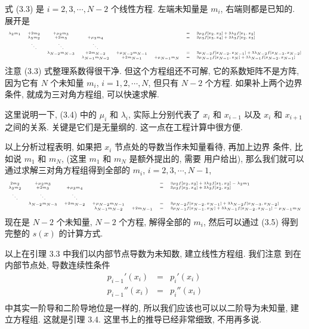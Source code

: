 \documentclass[a4paper]{ctexart}
\begin{document}
式 (3.3) 是 $i = 2, 3, \cdots, N - 2$ 个线性方程. 左端未知量是 $m_i$,
右端则都是已知的. 展开是
$$
\tiny
\begin{array}{cccccccl}
  \lambda_2 m_1 &+ 2 m_2 &+ \mu_2 m_3 &&&&=& 3 \mu_2 f[x_2, x_3] + 3 \lambda_2 f[x_1, x_2] \\
  &\lambda_3 m_2 &+ 2 m_3 &+ \mu_3 m_4 &&&=& 3 \mu_3 f[x_3, x_4] + 3 \lambda_3 f[x_2, x_3] \\
  &\ddots&\ddots&\ddots&&&&\\
  &&\lambda_{N - 2} m_{N - 3} &+ 2 m_{N - 2} &+ \mu_{N - 2} m_{N - 1} &&=& 3 \mu_{N - 2} f[x_{N - 2}, x_{N - 1}] + 3 \lambda_{N - 2} f[x_{N - 3}, x_{N - 2}] \\
  &&&\lambda_{N - 1} m_{N - 2} &+ 2 m_{N - 1} &+ \mu_{N - 1} m_N &=& 3 \mu_{N - 1} f[x_{N - 1}, x_N] + 3 \lambda_{N - 1} f[x_{N - 2}, x_{N - 1}] 
\end{array}
$$
注意 (3.3) 式整理系数得很干净. 但这个方程组还不可解, 
它的系数矩阵不是方阵, 因为它有 $N$ 个未知量 $m_i$, $i = 1, 2, \cdots, N$, 
但只有 $N - 2$ 个方程.
如果补上两个边界条件, 就成为三对角方程组, 可以快速求解.

这里说明一下, (3.4) 中的 $\mu_i$ 和 $\lambda_i$, 
实际上分别代表了 $x_i$ 和 $x_{i - 1}$ 以及 $x_i$ 和 $x_{i + 1}$ 
之间的关系. 关键是它们是无量纲的. 这一点在工程计算中很方便. 

以上分析过程表明, 如果把 $x_i$ 节点处的导数当作未知量看待, 再加上边界
条件, 比如说 $m_1$ 和 $m_{N}$, (这里 $m_1$ 和 $m_N$ 是额外提出的, 需要
用户给出), 那么我们就可以通过求解三对角方程组得到全部的 $m_i$, $i = 2,
3, \cdots, N - 1$,
$$
\tiny
\begin{array}{ccccccl}
  2 m_2 &+ \mu_2 m_3 &&&&=& 3 \mu_2 f[x_2, x_3] + 3 \lambda_2 f[x_1, x_2] - \lambda_2 m_1\\
  \lambda_3 m_2 &+ 2 m_3 &+ \mu_3 m_4 &&&=& 3 \mu_3 f[x_3, x_4] + 3 \lambda_3 f[x_2, x_3] \\
  \ddots&\ddots&\ddots&&&&\\
  &\lambda_{N - 2} m_{N - 3} &+ 2 m_{N - 2} &+ \mu_{N - 2} m_{N - 1} &&=& 3 \mu_{N - 2} f[x_{N - 2}, x_{N - 1}] + 3 \lambda_{N - 2} f[x_{N - 3}, x_{N - 2}] \\
  &&&\lambda_{N - 1} m_{N - 2} &+ 2 m_{N - 1} &=& 3 \mu_{N - 1} f[x_{N - 1}, x_N] + 3 \lambda_{N - 1} f[x_{N - 2}, x_{N - 1}] - \mu_{N - 1} m_N 
\end{array}
$$
现在是 $N - 2$ 个未知量, $N - 2$ 个方程, 解得全部的 $m_i$,
然后可以通过 (3.5) 得到完整的 $s(x)$ 的计算方式. 

以上在引理 3.3 中我们以内部节点导数为未知数, 建立线性方程组. 我们注意
到在内部节点处, 导数连续性条件
$$
\begin{array}{rcl}
  p_{i - 1}'(x_i) &=& p_i'(x_i) \\
  p_{i - 1}''(x_i) &=& p_i''(x_i) \\
\end{array}
$$
中其实一阶导和二阶导地位是一样的, 所以我们应该也可以以二阶导为未知量,
建立方程组. 这就是引理 3.4. 这里书上的推导已经非常细致, 不用再多说.
\end{document}
